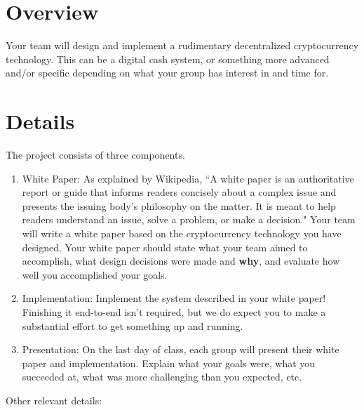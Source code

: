 \documentclass{article}
\begin{document}
\maketitle

\section*{Overview}
Your team will design and implement a rudimentary decentralized cryptocurrency technology. This can be a digital cash system, or something more advanced and/or specific depending on what your group has interest in and time for.

\section*{Details}
The project consists of three components.

\begin{enumerate}
\item White Paper: As explained by Wikipedia, ``A white paper is an authoritative report or guide that informs readers concisely about a complex issue and presents the issuing body's philosophy on the matter. It is meant to help readers understand an issue, solve a problem, or make a decision." Your team will write a white paper based on the cryptocurrency technology you have designed. Your white paper should state what your team aimed to accomplish, what design decisions were made and \textbf{why}, and evaluate how well you accomplished your goals.
\item Implementation: Implement the system described in your white paper! Finishing it end-to-end isn't required, but we do expect you to make a substantial effort to get something up and running.
\item Presentation: On the last day of class, each group will present their white paper and implementation. Explain what your goals were, what you succeeded at, what was more challenging than you expected, etc.
\end{enumerate}

\noindent \noindent Other relevant details:
\end{document}
